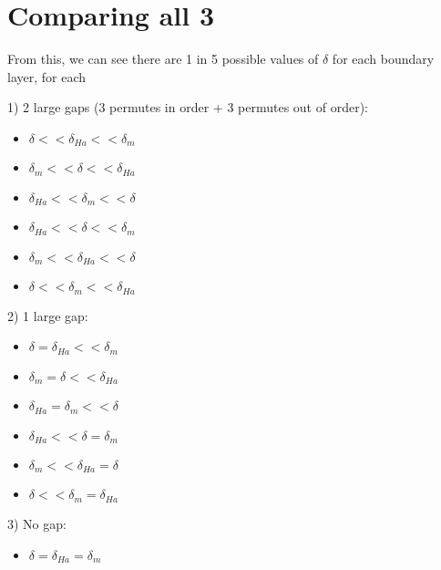 \documentclass[11pt]{article}
\begin{document}
\section{Comparing all 3}

From this, we can see there are 1 in 5 possible values of $\delta$ for each boundary layer, for each 

1) 2 large gaps (3 permutes in order + 3 permutes out of order):
\begin{itemize}
\setlength\itemsep{-1em}
	\item $\delta      <<    \delta_{Ha}   <<   \delta_m      $
	\item $\delta_m    <<    \delta        <<   \delta_{Ha}   $
	\item $\delta_{Ha} <<    \delta_m      <<   \delta        $
	\item $\delta_{Ha} <<    \delta        <<   \delta_m      $
	\item $\delta_m    <<    \delta_{Ha}   <<   \delta        $
	\item $\delta      <<    \delta_m      <<   \delta_{Ha}   $
\end{itemize}

2) 1 large gap:
\begin{itemize}
\setlength\itemsep{-1em}
	\item $\delta      =     \delta_{Ha}   <<   \delta_m      $
	\item $\delta_m    =     \delta        <<   \delta_{Ha}   $
	\item $\delta_{Ha} =     \delta_m      <<   \delta        $
	\item $\delta_{Ha} <<    \delta        =    \delta_m      $
	\item $\delta_m    <<    \delta_{Ha}   =    \delta        $
	\item $\delta      <<    \delta_m      =    \delta_{Ha}   $
\end{itemize}

3) No gap:
\begin{itemize}
\setlength\itemsep{-1em}
	\item $\delta      =     \delta_{Ha}   =    \delta_m      $
\end{itemize}
\end{document}
